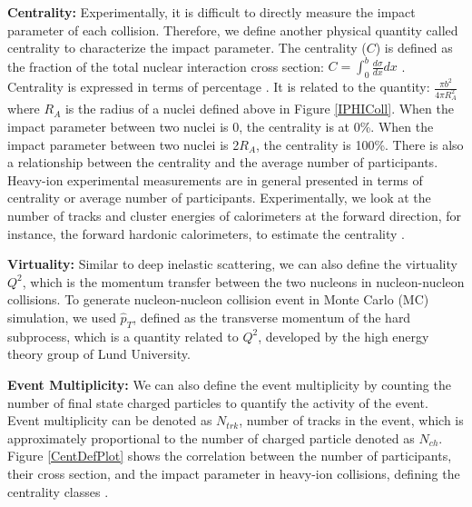 \textbf{Centrality:} Experimentally, it is difficult to directly measure the impact parameter of each collision. Therefore, we define another physical quantity called centrality to characterize the impact parameter. The centrality ($C$) is defined as the fraction of the total nuclear interaction cross section: $C = \int^b_0 \frac{d\sigma}{dx} dx$ . Centrality is expressed in terms of percentage \cite{CentDef}. It is related to the quantity: $\frac{\pi b^2}{4\pi R_A^2}$ where $R_A$ is the radius of a nuclei defined above in Figure \ref{IPHIColl}. When the impact parameter between two nuclei is 0, the centrality is at 0\%. When the impact parameter between two nuclei is 2$R_A$, the centrality is 100\%. There is also a relationship between the centrality and the average number of participants. Heavy-ion experimental measurements are in general presented in terms of centrality or average number of participants. Experimentally, we look at the number of tracks and cluster energies of calorimeters at the forward direction, for instance, the forward hardonic calorimeters, to estimate the centrality \cite{ALICEZDC,CMSZDC,ATLASZDC}. 


\textbf{Virtuality:} Similar to deep inelastic scattering, we can also define the virtuality $Q^2$, which is the momentum transfer between the two nucleons in nucleon-nucleon collisions. To generate nucleon-nucleon collision event in Monte Carlo (MC) simulation, we used $\hat p_T$, defined as the transverse momentum of the hard subprocess, which is a quantity related to $Q^2$, developed by the high energy theory group of Lund University.


\textbf{Event Multiplicity:} We can also define the event multiplicity by counting the number of final state charged particles to quantify the activity of the event. Event multiplicity can be denoted as $N_{trk}$, number of tracks in the event, which is approximately proportional to the number of charged particle denoted as $N_{ch}$. Figure \ref{CentDefPlot} shows the correlation between the number of participants, their cross section, and the impact parameter in heavy-ion collisions, defining the centrality classes \cite{CentPlot}.


